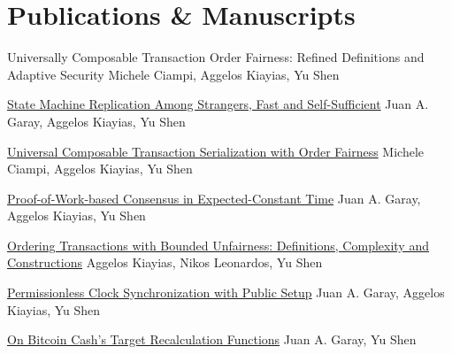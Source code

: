 \section{Publications \& Manuscripts}

{Universally Composable Transaction Order Fairness: Refined Definitions and Adaptive Security}
{}
{}
{}
{\normalsize Michele Ciampi, Aggelos Kiayias, Yu Shen}

{\href{https://eprint.iacr.org/2025/616.pdf}{State Machine Replication Among Strangers, Fast and Self-Sufficient}}
{}
{}
{}
{\normalsize Juan A. Garay, Aggelos Kiayias, Yu Shen}

{\href{https://eprint.iacr.org/2024/1296.pdf}{Universal Composable Transaction Serialization with Order Fairness}}
{}
{}
{}
{\normalsize Michele Ciampi, Aggelos Kiayias, Yu Shen}

{\href{https://eprint.iacr.org/2023/1663.pdf}{Proof-of-Work-based Consensus in Expected-Constant Time}}
{}
{}
{}
{\normalsize Juan A. Garay, Aggelos Kiayias, Yu Shen}

{\href{https://eprint.iacr.org/2023/1253.pdf}{Ordering Transactions with Bounded Unfairness: Definitions, Complexity and Constructions}}
{}
{}
{}
{\normalsize Aggelos Kiayias, Nikos Leonardos, Yu Shen}

{\href{https://eprint.iacr.org/2022/1220.pdf}{Permissionless Clock Synchronization with Public Setup}}
{}
{}
{}
{\normalsize Juan A. Garay, Aggelos Kiayias, Yu Shen}

{\href{https://eprint.iacr.org/2021/143.pdf}{On Bitcoin Cash's Target Recalculation Functions}}
{}
{}
{}
{\normalsize Juan A. Garay, Yu Shen}